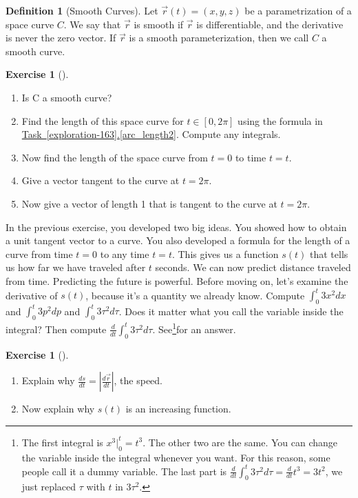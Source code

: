 \documentclass[10pt,]{book}
\theoremstyle{plain}
\theoremstyle{definition}
\newtheorem{definition}[theorem]{Definition}
\theoremstyle{definition}
\theoremstyle{definition}
\theoremstyle{definition}
\newtheorem{exploration}[project]{Exercise}
\theoremstyle{definition}
\numberwithin{equation}{section}
\newcommand{\ds}{\displaystyle}
\begin{document}
\begin{definition}[{Smooth Curves}]\label{def_smooth_curve}
Let \(\vec r(t)=(x,y,z)\) be a parametrization of a space curve \(C\). We say that \(\vec r\) is smooth if \(\vec r\) is differentiable, and the derivative is never the zero vector. If \(\vec r\) is a smooth parameterization, then we call \(C\) a smooth curve.%
\end{definition}
\begin{exploration}[]\label{prob_basic_helix}
\leavevmode%
\begin{enumerate}[font=\bfseries,label=(\alph*),ref=\alph*]
\item\label{task-386} Is C a smooth curve?%
\item\label{task-387} Find the length of this space curve for \(t\in[0,2\pi]\) using the formula in \hyperref[arc_length2]{Task~\ref{exploration-163}.\ref{arc_length2}}. Compute any integrals.%
\item\label{task-388} Now find the length of the space curve from \(t=0\) to time \(t=t\).%
\item\label{task-389} Give a vector tangent to the curve at \(t=2\pi\).%
\item\label{task-390} Now give a vector of length 1 that is tangent to the curve at \(t=2\pi\).%
\end{enumerate}
\end{exploration}
In the previous exercise, you developed two big ideas. You showed how to obtain a unit tangent vector to a curve. You also developed a formula for the length of a curve from time \(t=0\) to any time \(t=t\). This gives us a function \(s(t)\) that tells us how far we have traveled after \(t\) seconds. We can now predict distance traveled from time. Predicting the future is powerful. Before moving on, let's examine the derivative of \(s(t)\), because it's a quantity we already know.%
Compute \(\ds \int_0^t 3x^2 dx\) and \(\ds \int_0^t 3p^2 dp\) and \(\ds \int_0^t 3\tau^2 d\tau\). Does it matter what you call the variable inside the integral? Then compute \(\ds\frac{d}{dt} \int_0^t 3\tau^2 d\tau\). See\footnote{The first integral is \(x^3|_0^t = t^3\). The other two are the same. You can change the variable inside the integral whenever you want.  For this reason, some people call it a dummy variable. The last part is \(\ds\frac{d}{dt} \int_0^t 3\tau^2 d\tau = \frac{d}{dt} t^3 = 3t^2\), we just replaced \(\tau\) with \(t\) in \(3\tau^2\).\label{fn-9}}for an answer.%
\begin{exploration}[]\label{fundamental_theorem_of_calculus_as_it_applies_to_arc_length_parameter}
\leavevmode%
\begin{enumerate}[font=\bfseries,label=(\alph*),ref=\alph*]
\item\label{task-391} Explain why \(\ds\frac{ds}{dt} = \left|\frac {d\vec r}{dt} \right|\), the speed.%
\item\label{task-392} Now explain why \(s(t)\) is an increasing function.%
\end{enumerate}
\end{exploration}
\end{document}
